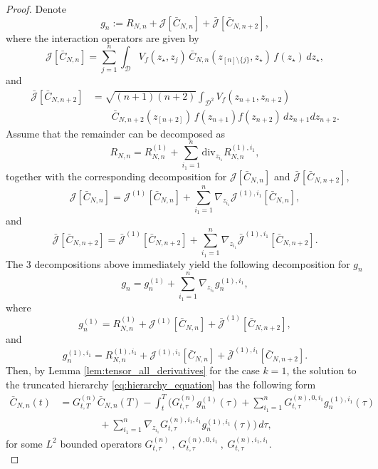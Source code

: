 \documentclass[pdflatex,sn-mathphys-num]{sn-jnl}
\theoremstyle{thmstyleone}%
\theoremstyle{thmstyletwo}%
\theoremstyle{thmstylethree}%
\begin{document}
\begin{proof}
Denote
\[
g_n := R_{N,n} + \mathcal J[\bar C_{N,n}] + \bar{\mathcal J}[\bar C_{N,n+2}],
\]
where the interaction operators are given by
\[
\mathcal J[\bar C_{N,n}]
=
\sum_{j=1}^{n}
\int_{\mathcal D}
V_f(z_{\star}, z_j)\,
\bar C_{N,n}(z_{[n]\setminus\{j\}}, z_\star)\,
f(z_{\star})\,dz_{\star},
\]
and
\[
\begin{aligned}
\bar{\mathcal J}[\bar C_{N,n+2}]
&=\sqrt{(n+1)(n+2)}
\int_{\mathcal D^2}
V_f(z_{n+1},z_{n+2}) \\
&\qquad 
\bar C_{N,n+2}(z_{[n+2]})\,
f(z_{n+1})f(z_{n+2})\,
dz_{n+1}dz_{n+2}.
\end{aligned}
\]
Assume that the remainder can be decomposed as 
\[
R_{N,n}
= R_{N,n}^{(1)} + \sum_{i_1=1}^n \mathrm{div}_{z_{i_1}} R_{N,n}^{(1),i_1}
,\]
together with the corresponding decomposition for $\mathcal J[\bar C_{N,n}]$ and $\bar{\mathcal J}[\bar C_{N,n+2}]$,
\[\mathcal J[\bar C_{N,n}] = \mathcal J^{(1)}[\bar C_{N,n}] + \sum_{i_1=1}^n \nabla_{z_{i_1}} \mathcal J^{(1),i_1}[\bar C_{N,n}],\]
and 
\[
\bar{\mathcal J}[\bar C_{N,n+2}] = \bar{\mathcal J}^{(1)}[\bar C_{N,n+2}] + \sum_{i_1=1}^n \nabla_{z_{i_1}} \bar{\mathcal J}^{(1),i_1}[\bar C_{N,n+2}].
\]
The 3 decompositions above immediately yield the following decomposition for $g_n$
\[g_n = g_n^{(1)} + \sum_{i_1=1}^n \nabla_{z_{i_1}} g_n^{(1),i_1}, 
\]
where 
\[
g_n^{(1)} = R_{N,n}^{(1)} + \mathcal J^{(1)}[\bar C_{N,n}] + \bar{\mathcal J}^{(1)}[\bar C_{N,n+2}],
\]
and 
\[
g_n^{(1),i_1} = R_{N,n}^{(1),i_1} + \mathcal J^{(1),i_1}[\bar C_{N,n}] + \bar{\mathcal J}^{(1),i_1}[\bar C_{N,n+2}].
\]
Then, by Lemma \ref{lem:tensor_all_derivatives} for the case $k=1$, the solution to the truncated hierarchy \eqref{eq:hierarchy_equation} has the following form 
\begin{equation}\label{eq:Duhamel_rep}
\begin{aligned}
\bar{C}_{N,n}(t)
&= G_{t,T}^{(n)}\bar{C}_{N,n}(T)
- \int_t^T \Bigg(
G_{t,\tau}^{(n)}g_n^{(1)}(\tau)
+ \sum_{i_1=1}^n G_{t,\tau}^{(n),0,i_1}g_n^{(1),i_1}(\tau) \\
&\qquad\qquad
+ \sum_{i_1=1}^n
\nabla_{z_{i_1}}G_{t,\tau}^{(n),i_1,i_1}
g_n^{(1),i_1}(\tau)
\Bigg)\,d\tau ,
\end{aligned}
\end{equation}
for some $L^2$ bounded operators $ G_{t,\tau}^{(n)} \ , \ G_{t,\tau}^{(n),0,i_1} \ , \ G_{t,\tau}^{(n),i_1,i_1}$. \\


\end{proof}
\end{document}
